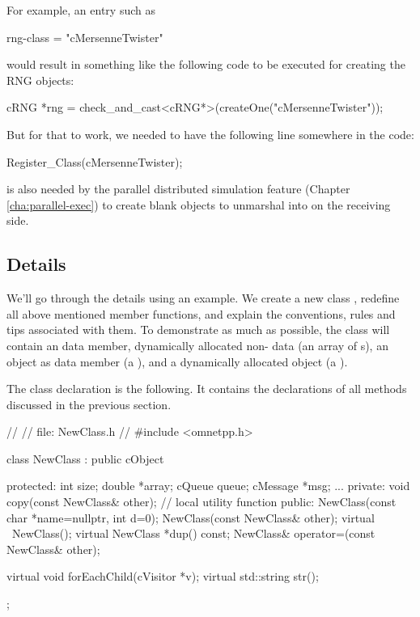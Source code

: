 For example, an  entry such as

\begin{inifile}
rng-class = "cMersenneTwister"
\end{inifile}

would result in something like the following code to be executed
for creating the RNG objects:

\begin{cpp}
cRNG *rng = check_and_cast<cRNG*>(createOne("cMersenneTwister"));
\end{cpp}

But for that to work, we needed to have the following line somewhere in the code:

\begin{cpp}
Register_Class(cMersenneTwister);
\end{cpp}

 is also needed by the parallel distributed simulation feature
(Chapter \ref{cha:parallel-exec}) to create blank objects to unmarshal into
on the receiving side.


\subsection{Details}
\label{sec:sim-lib:subclassing-cobject-details}

We'll go through the details using an example. We create a new
class , redefine all above mentioned 
member functions, and explain the conventions, rules and tips
associated with them.
To demonstrate as much as possible, the class will contain
an  data member, dynamically allocated non- data
(an array of s),
an {\opp} object as data member (a ), and
a dynamically allocated {\opp} object (a ).

The class declaration is the following. It contains the declarations
of all methods discussed in the previous section.

\begin{cpp}
//
// file: NewClass.h
//
#include <omnetpp.h>

class NewClass : public cObject
{
  protected:
    int size;
    double *array;
    cQueue queue;
    cMessage *msg;
    ...
  private:
    void copy(const NewClass& other); // local utility function
  public:
    NewClass(const char *name=nullptr, int d=0);
    NewClass(const NewClass& other);
    virtual ~NewClass();
    virtual NewClass *dup() const;
    NewClass& operator=(const NewClass& other);

    virtual void forEachChild(cVisitor *v);
    virtual std::string str();
};
\end{cpp}

